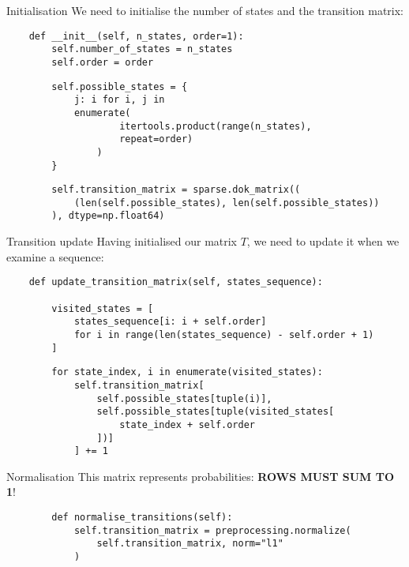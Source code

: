 \documentclass[10pt]{beamer}
\begin{document}
	\begin{frame}[fragile]{Initialisation}
		We need to initialise the number of states and the transition matrix:
	\pause
		
	\begin{verbatim}
	def __init__(self, n_states, order=1):
		self.number_of_states = n_states
		self.order = order
    \end{verbatim}
    
    \pause
    \begin{verbatim}
        self.possible_states = {
            j: i for i, j in
            enumerate(
            		itertools.product(range(n_states),
            		repeat=order)
            	)
        }
	\end{verbatim}
	\pause
	\begin{verbatim}
        self.transition_matrix = sparse.dok_matrix((
            (len(self.possible_states), len(self.possible_states))
        ), dtype=np.float64)
	\end{verbatim}
	
	\end{frame}
	
	\begin{frame}[fragile]{Transition update}
	Having initialised our matrix $T$, we need to update it when we examine a sequence:
	\pause
	\begin{verbatim}
	def update_transition_matrix(self, states_sequence):

		visited_states = [
			states_sequence[i: i + self.order]
			for i in range(len(states_sequence) - self.order + 1)
		]
	\end{verbatim}
	\pause
	\begin{verbatim}
		for state_index, i in enumerate(visited_states):
			self.transition_matrix[
				self.possible_states[tuple(i)],
				self.possible_states[tuple(visited_states[
					state_index + self.order
				])]
			] += 1
	\end{verbatim}

	\end{frame}
	
	\begin{frame}
	\end{frame}
	
	\begin{frame}[fragile]{Normalisation}
	This matrix represents probabilities: \textbf{ROWS MUST SUM TO 1}!
	\pause
	\vspace{0.5cm}
	\begin{verbatim}
		def normalise_transitions(self):
			self.transition_matrix = preprocessing.normalize(
				self.transition_matrix, norm="l1"
			)
	\end{verbatim}
	

	\end{frame}
	
\end{document}

